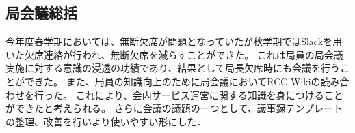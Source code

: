 \subsection*{局会議総括}


今年度春学期においては、無断欠席が問題となっていたが秋学期ではSlackを用いた欠席連絡が行われ、無断欠席を減らすことができた。
これは局員の局会議実施に対する意識の浸透の功績であり、結果として局長欠席時にも会議を行うことができた。
また、局員の知識向上のために局会議においてRCC Wikiの読み合わせを行った。
これにより、会内サービス運営に関する知識を身につけることができたと考えられる。
さらに会議の議題の一つとして、議事録テンプレートの整理、改善を行いより使いやすい形にした．

